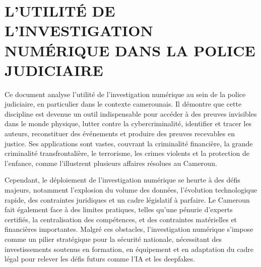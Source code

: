 \documentclass[12pt,a4paper]{article}
\begin{document}
{		\section*	{L’UTILITÉ DE L’INVESTIGATION NUMÉRIQUE DANS LA POLICE JUDICIAIRE}
		
		Ce document analyse l'utilité de l'investigation numérique au sein de la police judiciaire, en particulier dans le contexte camerounais. Il démontre que cette discipline est devenue un outil indispensable pour accéder à des preuves invisibles dans le monde physique, lutter contre la cybercriminalité, identifier et tracer les auteurs, reconstituer des événements et produire des preuves recevables en justice. Ses applications sont vastes, couvrant la criminalité financière, la grande criminalité transfrontalière, le terrorisme, les crimes violents et la protection de l'enfance, comme l'illustrent plusieurs affaires résolues au Cameroun.
		
		Cependant, le déploiement de l'investigation numérique se heurte à des défis majeurs, notamment l'explosion du volume des données, l'évolution technologique rapide, des contraintes juridiques et un cadre législatif à parfaire. Le Cameroun fait également face à des limites pratiques, telles qu'une pénurie d'experts certifiés, la centralisation des compétences, et des contraintes matérielles et financières importantes. Malgré ces obstacles, l'investigation numérique s'impose comme un pilier stratégique pour la sécurité nationale, nécessitant des investissements soutenus en formation, en équipement et en adaptation du cadre légal pour relever les défis futurs comme l'IA et les deepfakes.
			
	
		}
	
\end{document}
